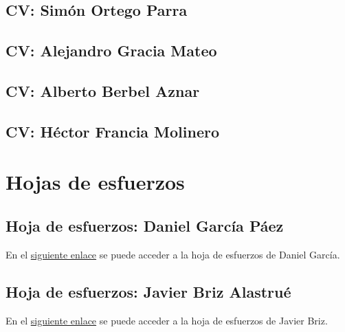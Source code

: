 \documentclass[10pt,spanish]{article}
\let\stdsection\section
\renewcommand\section{\newpage\stdsection}
\newcommand{\hojaesfuerzos}[2]{\href{run:recopilacion_esfuerzos/#1.xls}{#2}}
\begin{document}
\subsection{CV: Simón Ortego Parra}

\newpage

\subsection{CV: Alejandro Gracia Mateo}

\newpage

\subsection{CV: Alberto Berbel Aznar}

\newpage

\subsection{CV: Héctor Francia Molinero}

\newpage


\section{Hojas de esfuerzos}\label{sec:hojas_esfuerzos}
%
%
\subsection{Hoja de esfuerzos: Daniel García Páez}
%
En el \hojaesfuerzos{daniel_recopilacion_esfuerzos}{siguiente enlace} se puede acceder a la hoja de 
esfuerzos de Daniel García.

\subsection{Hoja de esfuerzos: Javier Briz Alastrué}
%
En el \hojaesfuerzos{javier_recopilacion_esfuerzos}{siguiente enlace} se puede acceder a la hoja de 
esfuerzos de Javier Briz.
\end{document}
